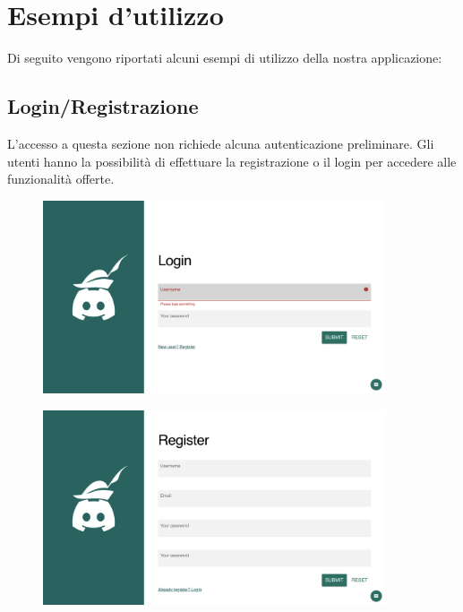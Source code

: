 \section{Esempi d'utilizzo}
Di seguito vengono riportati alcuni esempi di utilizzo della nostra applicazione:

%
%
%
\subsection{Login/Registrazione}
L'accesso a questa sezione non richiede alcuna autenticazione preliminare. Gli utenti hanno la possibilità di effettuare la registrazione o il login per accedere alle funzionalità offerte.

\begin{figure}[htbp]
    \centering
    \includegraphics[width=0.9\textwidth]{sections/07-usage-example/img/Login.png}
    \label{fig:login_img}
\end{figure}


\begin{figure}[htbp]
    \centering
    \includegraphics[width=0.9\textwidth]{sections/07-usage-example/img/Register.png}
    \label{fig:register_demo}
\end{figure}

